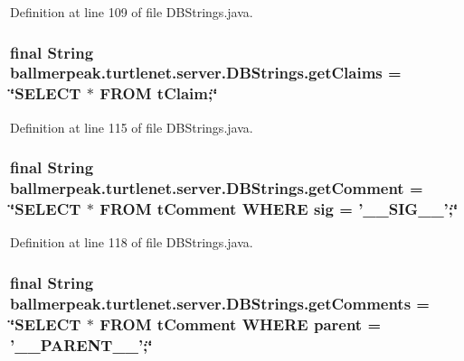 Definition at line 109 of file D\-B\-Strings.\-java.

\hypertarget{classballmerpeak_1_1turtlenet_1_1server_1_1DBStrings_a18809032ae6a521a9293b4f4e8cfa5f4}{
\subsubsection[{get\-Claims}]{\setlength{\rightskip}{0pt plus 5cm}final String ballmerpeak.\-turtlenet.\-server.\-D\-B\-Strings.\-get\-Claims = \char`\"{}S\-E\-L\-E\-C\-T $\ast$ F\-R\-O\-M t\-Claim;\char`\"{}\hspace{0.3cm}{\ttfamily [static]}}}\label{classballmerpeak_1_1turtlenet_1_1server_1_1DBStrings_a18809032ae6a521a9293b4f4e8cfa5f4}


Definition at line 115 of file D\-B\-Strings.\-java.

\hypertarget{classballmerpeak_1_1turtlenet_1_1server_1_1DBStrings_a5584702225a961d74dc35ee4660c136e}{
\subsubsection[{get\-Comment}]{\setlength{\rightskip}{0pt plus 5cm}final String ballmerpeak.\-turtlenet.\-server.\-D\-B\-Strings.\-get\-Comment = \char`\"{}S\-E\-L\-E\-C\-T $\ast$ F\-R\-O\-M t\-Comment W\-H\-E\-R\-E sig = '\-\_\-\-\_\-\-S\-I\-G\-\_\-\-\_\-';\char`\"{}\hspace{0.3cm}{\ttfamily [static]}}}\label{classballmerpeak_1_1turtlenet_1_1server_1_1DBStrings_a5584702225a961d74dc35ee4660c136e}


Definition at line 118 of file D\-B\-Strings.\-java.

\hypertarget{classballmerpeak_1_1turtlenet_1_1server_1_1DBStrings_a1576b88412e7eac8188422b2f9945cd4}{
\subsubsection[{get\-Comments}]{\setlength{\rightskip}{0pt plus 5cm}final String ballmerpeak.\-turtlenet.\-server.\-D\-B\-Strings.\-get\-Comments = \char`\"{}S\-E\-L\-E\-C\-T $\ast$ F\-R\-O\-M t\-Comment W\-H\-E\-R\-E parent = '\-\_\-\-\_\-\-P\-A\-R\-E\-N\-T\-\_\-\-\_\-';\char`\"{}\hspace{0.3cm}{\ttfamily [static]}}}\label{classballmerpeak_1_1turtlenet_1_1server_1_1DBStrings_a1576b88412e7eac8188422b2f9945cd4}


